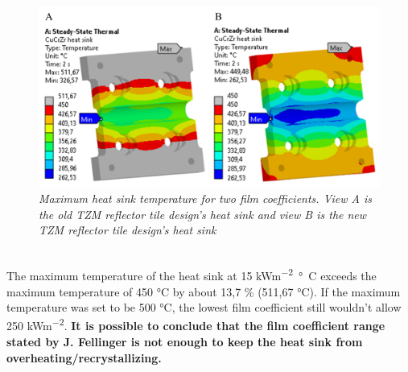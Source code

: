\begin{figure}[h!]
    \label{fig_5_8} 
    \centering
    \includegraphics[width=.7\textwidth]{figures/filmcoefficient15and30TEMPERATREFRINGEHS.png}
    \caption{\it Maximum heat sink temperature for two film coefficients. View A is the old \acrshort{TZM} reflector tile design's heat sink and view B is the new \acrshort{TZM} reflector tile design's heat sink}
\end{figure}
\\
\normalsize{\indent The maximum temperature of the heat sink at 15 \unit{kWm^{-2}\si{\degree}C} exceeds the maximum temperature of 450 \unit{\si{\degree}}C \cite{Fellinger_2013} \cite{zhu_parametric_2019} by about 13,7 \% (511,67 \unit{\si{\degree}}C). If the maximum temperature was set to be 500 \unit{\si{\degree}}C, the lowest film coefficient still wouldn't allow 250 \unit{kWm^{-2}}. {\bfseries It is possible to conclude that the film coefficient range stated by J. Fellinger is not enough to keep the heat sink from overheating/recrystallizing.}}
